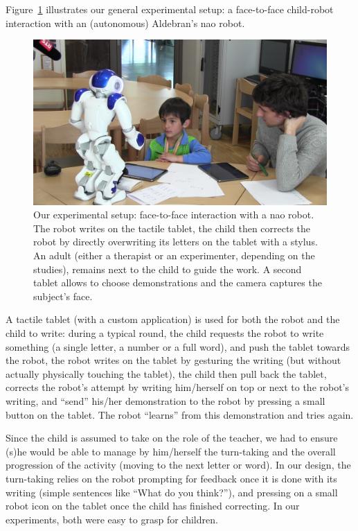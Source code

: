 \documentclass{sig-alternate}
\begin{document}
Figure~\ref{fig:realSetup} illustrates our general experimental setup: a
face-to-face child-robot interaction with an (autonomous) Aldebran's {\sc nao}
robot.

\begin{figure}[h!]
    \centering
    \includegraphics[width=1\columnwidth]{realSetup}
    \caption{\small Our experimental setup: face-to-face interaction with a {\sc
            nao} robot.  The robot writes on the tactile tablet, the child then
            corrects the robot by directly overwriting its letters on the tablet
            with a stylus. An adult (either a therapist or an experimenter,
            depending on the studies), remains next to the child to guide the work. 
            A second tablet allows to choose demonstrations and the camera captures the subject's face.}
    \label{fig:realSetup}
\end{figure}

A tactile tablet (with a custom application) is used for both the robot and the child to write: during a typical round, the child requests the robot to write something (a single letter, a number or a full word), and push the tablet towards the robot, the robot writes on the tablet by gesturing the writing (but without actually physically touching the tablet), the child then pull back the
tablet, corrects the robot's attempt by writing him/herself on top or next to the robot's writing, and ``send'' his/her demonstration to the robot by pressing a small button on the tablet. The robot ``learns'' from this demonstration and tries again.

Since the child is assumed to take on the role of the teacher, we had to ensure (s)he would be able to manage by him/herself the turn-taking and the overall progression of the activity (moving to the next letter or word). In our design, the turn-taking relies on the robot prompting for feedback once it is done with its writing (simple sentences like ``What do you think?''), and pressing on a
small robot icon on the tablet once the child has finished correcting. In our experiments, both were easy to grasp for children.
\end{document}
